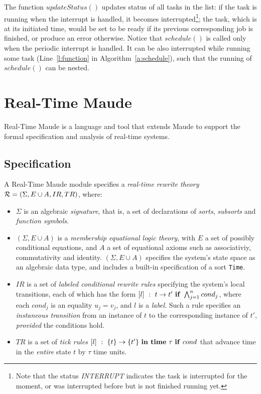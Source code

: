\documentclass{llncs}
\begin{document}
The function $updateStatus()$ updates status of all tasks in the list:
if the task is running when the interrupt is handled, it becomes
interrupted\footnote{Note that the status \textit{INTERRUPT} indicates
  the task is interrupted for the moment, or was interrupted before
  but is not finished running yet.}; the task, which is at its
initiated time, would be set to be ready if its previous corresponding
job is finished, or produce an error otherwise. Notice that
$schedule()$ is called only when the periodic interrupt is handled. It
can be also interrupted while running some task (Line~\ref{l:function}
in Algorithm~\ref{a:schedule}), such that the running of $schedule()$
can be nested.

\section{Real-Time Maude}
Real-Time Maude is a language and tool that extends Maude to support
the formal specification and analysis of real-time systems.

\subsection{Specification}
A Real-Time Maude module specifies a \emph{real-time rewrite theory}
${\cal R} = (\Sigma, E\cup A , IR, TR)$, where:
\begin{itemize}
\item $\Sigma$ is an algebraic \emph{signature}, that is, a set of
  declarations of \emph{sorts}, \emph{subsorts} and \emph{function
    symbols}.
\item $(\Sigma, E\cup A)$ is a \emph{membership equational logic
  theory}, with $E$ a set of possibly conditional equations, and $A$ a
  set of equational axioms such as associativiy, commutativity and
  identity.  $(\Sigma, E\cup A)$ specifies the system's state space as
  an algebraic data type, and includes a built-in specification of a
  sort \verb|Time|.
\item $IR$ is a set of \emph{labeled conditional rewrite rules}
  specifying the system's local transitions, each of which has the
  form $[l]~:~t\rightarrow t'\mbox{ \textbf{if}
  }\bigwedge^n_{j=1}cond_j$, where each $cond_j$ is an equality
  $u_j=v_j$, and $l$ is a \emph{label}. Such a rule specifies an
  \emph{instaneous transition} from an instance of $t$ to the
  corresponding instance of $t'$, \emph{provided} the conditions hold.
\item $TR$ is a set of \emph{tick rules} $[l]~:~\{t\}\rightarrow\{t'\}
  \mbox{ \textbf{in time} }\tau\mbox{ \textbf{if} }cond$ that advance
  time in the \emph{entire} state $t$ by $\tau$ time units.
\end{itemize}
\end{document}
